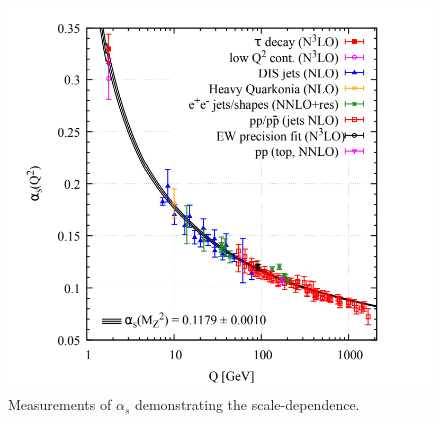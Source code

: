 \begin{figure}[htbp]
\centering
\includegraphics[width=0.6\linewidth]{plots/SM/a_s.png}
\caption{Measurements of $\alpha_s$ demonstrating the scale-dependence\cite{PhysRevD.98.030001}.}
\label{fig:sm:alpha_s}
\end{figure}